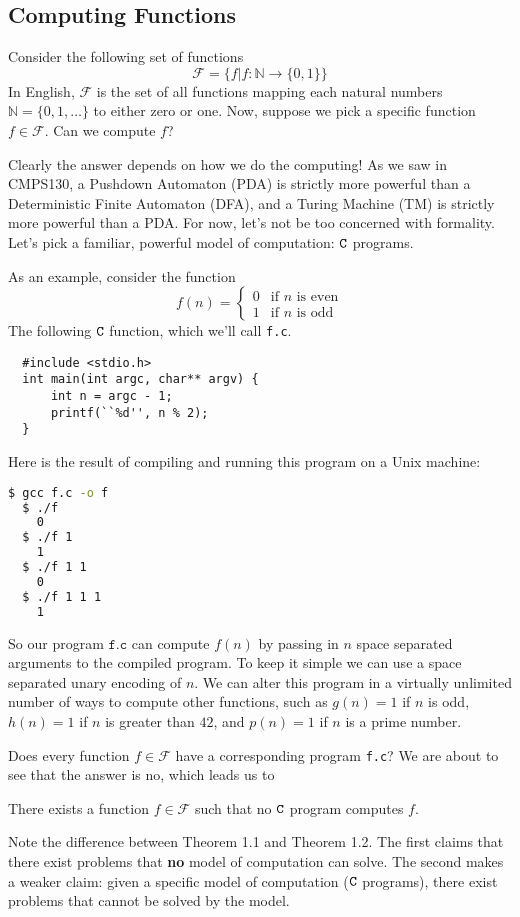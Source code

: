 \documentclass[english, 12pt]{article}
\begin{document}
  \subsection{Computing Functions}
  Consider the following set of functions
  \[ \mathcal{F} = \{ f | f : \mathbb{N} \rightarrow \{0,1\} \} \]
  In English, $\mathcal{F}$ is the set of all functions mapping each natural
  numbers \(\mathbb{N} = \{0, 1, \dots \} \) to either zero or one.
  Now, suppose we pick a specific function $f \in \mathcal{F}$. Can we
  compute $f$? \n

  Clearly the answer depends on how we do the computing! As we saw in
  CMPS130, a Pushdown Automaton (PDA) is strictly more powerful than a
  Deterministic Finite Automaton (DFA), and a Turing Machine (TM) is
  strictly more powerful than a PDA. For now, let's not be too concerned
  with formality. Let's pick a familiar, powerful model of computation:
  ${\texttt{C}}$ programs. \n

  As an example, consider the function 
  \[f(n) = \begin{cases} 0 & \text{if $n$ is even} \\
                         1 & \text{if $n$ is odd} \end{cases}\]
  The following ${\texttt{C}}$ function, which we'll call \texttt{f.c}.
  \begin{lstlisting}
  #include <stdio.h>
  int main(int argc, char** argv) {
      int n = argc - 1;
      printf(``%d'', n % 2);
  }
  \end{lstlisting}
  Here is the result of compiling and running this program on a Unix machine:
  \begin{lstlisting}[language=bash]
  $ gcc f.c -o f
  $ ./f
    0
  $ ./f 1
    1
  $ ./f 1 1
    0
  $ ./f 1 1 1
    1
  \end{lstlisting}
  So our program $\texttt{f.c}$ can compute $f(n)$ by passing in 
  $n$ space separated arguments to the compiled program. To keep it simple we
  can use a space separated unary encoding of $n$. We can alter this program
  in a virtually unlimited number of ways to compute other functions, such
  as $g(n) = 1$ if $n$ is odd, $h(n) = 1$ if $n$ is greater than $42$, and 
  $p(n) = 1$ if $n$ is a prime number.\n

  Does every function $f \in \mathcal{F}$ have a corresponding program 
  \texttt{f.c}? We are about to see that the answer is no, which leads us
  to
  \begin{thrm} There exists a function $f \in \mathcal{F}$ such that no
               ${\texttt{C}}$ program computes $f$.
  \end{thrm}
  Note the difference between Theorem 1.1 and Theorem 1.2. The first claims
  that there exist problems that {\bf no} model of computation can solve. The
  second makes a weaker claim: given a specific model of computation (${\texttt{C}}$ 
  programs), there exist problems that cannot be solved by the model.
\end{document}
